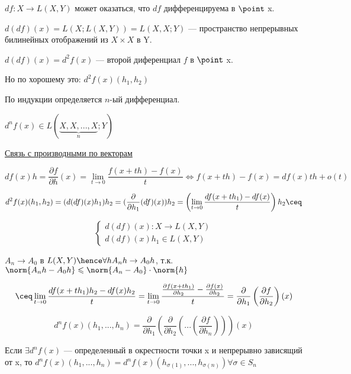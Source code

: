 \begin{enumerate}
    $df : X \to L(X, Y)$ может оказаться, что $df$ дифференцируема в $\point$ x.

    $d(df)(x) = L(X; L(X, Y)) = L(X, X ; Y)$ --- пространство непрерывных билинейных отображений из $X \times X $ в Y.
    
    $d(df)(x) = d^2 f(x)$ --- второй диференциал $f$ в $\point$ x.

    Но по хорошему это: $d^2 f(x) (h_1, h_2)$

    По индукции определяется $n$-ый дифференциал.

    $d ^ n f(x) \in L(\underbrace{X, X, ... , X}_{n}; Y)$


    \underline{Связь с производными по векторам}

    \[
        df(x) h = \frac{\partial f}{\partial h}(x) = \lim_{t \to 0} \frac{f(x + th) - f(x)}{t} \Longleftrightarrow  f(x + th) - f(x) = df(x) th + o(t)
    \]

    \[
        d ^ 2 f(x) (h_1, h_2) = (d(df) (x) h_1) h_2 = (\frac{\partial}{\partial h_1} (df)(x)) h_2 = \left(\lim_{t \to 0} \frac{df(x + th_1) - df(x)}{t} \right) h_2 \ceq
    \]

    \[
        \begin{cases}
            d(df)(x) : X \to L(X, Y)\\
            d(df)(x)h_1 \in L(X, Y)
        \end{cases}
    \] 

    \begin{remark}
        $A_n \to A_0$ в $L(X, Y) \hence \forall h A_n h \to A_0 h $, т.к. $\norm{A_n h - A_0 h} \leqslant \norm{A_n - A_0} \cdot \norm{h}$
    \end{remark}

    \[
        \ceq \lim_{t \to 0} \frac{df(x + th_1) h_2 - df(x)h_2}{t} = \lim_{t \to 0} \frac{\frac{\partial f(x + th_1)}{\partial h_2} - \frac{\partial f(x)}{\partial h_2}}{t} = \frac{\partial}{\partial h_1} \left(\frac{\partial f}{\partial h_2} \right) (x)
    \]

    \[
        d ^ n f(x) (h_1, ..., h_n) = \frac{\partial }{\partial h_1} \left( \frac{\partial}{\partial h_2} \left(... \left(\frac{\partial f}{\partial h_n} \right)\right) \right)(x)
    \]

    \begin{theorem}
        
        Если $\exists d^n f(x)$ --- определенный в окрестности точки x и непрерывно зависящий от x, то $d^n f(x)(h_1, ..., h_n) = d^n f(x) (h_{\sigma(1)}, ..., h_{\sigma(n)}) \forall \sigma \in S_n$ 
    \end{theorem}


\end{enumerate}
